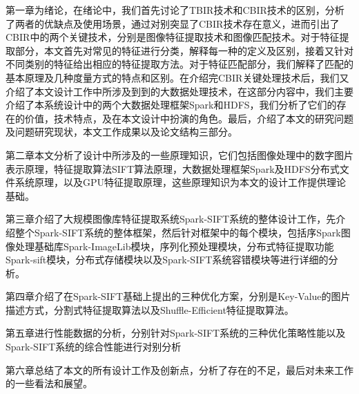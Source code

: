 第一章为绪论，在绪论中，我们首先讨论了TBIR技术和CBIR技术的区别，分析了两者的优缺点及使用场景，通过对别突显了CBIR技术存在意义，进而引出了CBIR中的两个关键技术，分别是图像特征提取技术和图像匹配技术。对于特征提取部分，本文首先对常见的特征进行分类，解释每一种的定义及区别，接着又针对不同类别的特征给出相应的特征提取方法。对于特征匹配部分，我们解释了匹配的基本原理及几种度量方式的特点和区别。在介绍完CBIR关键处理技术后，我们又介绍了本文设计工作中所涉及到到的大数据处理技术，在这部分内容中，我们主要介绍了本系统设计中的两个大数据处理框架Spark和HDFS，我们分析了它们的存在的价值，技术特点，及在本文设计中扮演的角色。最后，介绍了本文的研究问题及问题研究现状，本文工作成果以及论文结构三部分。

第二章本文分析了设计中所涉及的一些原理知识，它们包括图像处理中的数字图片表示原理，特征提取算法SIFT算法原理，大数据处理框架Spark及HDFS分布式文件系统原理，以及GPU特征提取原理，这些原理知识为本文的设计工作提供理论基础。

第三章介绍了大规模图像库特征提取系统Spark-SIFT系统的整体设计工作，先介绍整个Spark-SIFT系统的整体框架，然后针对框架中的每个模块，包括序Spark图像处理基础库Spark-ImageLib模块，序列化预处理模块，分布式特征提取功能Spark-sift模块，分布式存储模块以及Spark-SIFT系统容错模块等进行详细的分析。

第四章介绍了在Spark-SIFT基础上提出的三种优化方案，分别是Key-Value的图片描述方式，分割式特征提取算法以及Shuffle-Efficient特征提取算法。

第五章进行性能数据的分析，分别针对Spark-SIFT系统的三种优化策略性能以及Spark-SIFT系统的综合性能进行对别分析

第六章总结了本文的所有设计工作及创新点，分析了存在的不足，最后对未来工作的一些看法和展望。


